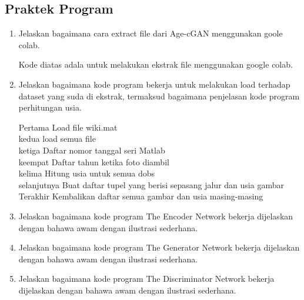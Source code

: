 \subsection{Praktek Program}
\begin{enumerate}

\item Jelaskan bagaimana cara extract file dari Age-cGAN menggunakan goole colab.

	\hfill\break
	
	
Kode diatas adala untuk melakukan ekstrak file menggunakan google colab.

\item Jelaskan bagaimana kode program bekerja untuk melakukan load terhadap dataset yang suda di ekstrak, termaksud bagaimana penjelasan kode program perhitungan usia.

	\hfill\break
	
	
Pertama Load file wiki.mat\\
kedua  load semua file\\
ketiga Daftar nomor tanggal seri Matlab\\
keempat Daftar tahun ketika foto diambil\\
kelima Hitung usia untuk semua dobs\\
selanjutnya Buat daftar tupel yang berisi sepasang jalur dan usia gambar
Terakhir Kembalikan daftar semua gambar dan usia masing-masing
	
\item Jelaskan bagaimana kode program The Encoder Network bekerja dijelaskan dengan bahawa awam dengan ilustrasi sederhana.

	\hfill\break
	
	
\item Jelaskan bagaimana kode program The Generator Network bekerja dijelaskan dengan bahawa awam dengan ilustrasi sederhana.

	\hfill\break
	 
	
\item Jelaskan bagaimana kode program The Discriminator Network bekerja dijelaskan dengan bahawa awam dengan ilustrasi sederhana.

	\hfill\break
	
	

\end{enumerate}
